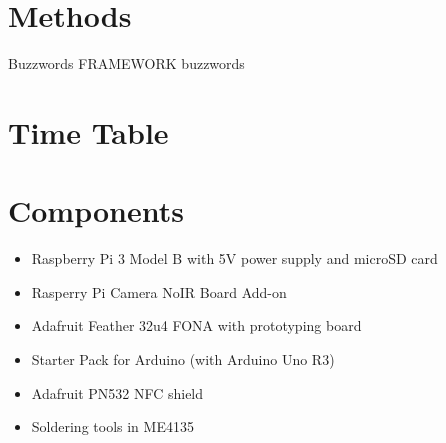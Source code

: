 \documentclass{article}
\begin{document}
\lipsum[1]

\section{Methods}

Buzzwords FRAMEWORK buzzwords
\lipsum[1]

\section{Time Table}

\lipsum[1]

\section{Components}

\begin{itemize}
\item Raspberry Pi 3 Model B with 5V power supply and microSD card
\item Rasperry Pi Camera NoIR Board Add-on
\item Adafruit Feather 32u4 FONA with prototyping board
\item Starter Pack for Arduino (with Arduino Uno R3)
\item Adafruit PN532 NFC shield
\item Soldering tools in ME4135
\end{itemize}

\pagebreak

\printbibliography
\end{document}
